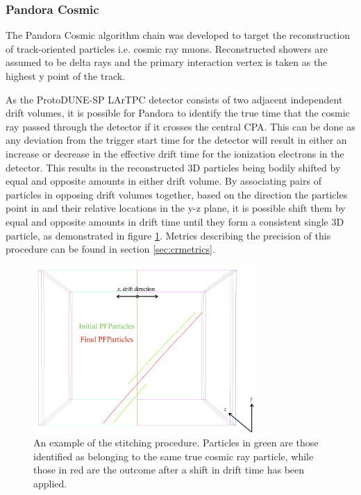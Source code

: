 
\subsubsection{Pandora Cosmic}

The Pandora Cosmic algorithm chain \cite{pandorauboone} was developed to target the reconstruction of track-oriented particles i.e. cosmic ray muons.  Reconstructed showers are assumed to be delta rays and the primary interaction vertex is taken as the highest y point of the track.

As the ProtoDUNE-SP LArTPC detector consists of two adjacent independent drift volumes, it is possible for Pandora to identify the true time that the cosmic ray passed through the detector if it crosses the central CPA.  This can be done as any deviation from the trigger start time for the detector will result in either an increase or decrease in the effective drift time for the ionization electrons in the detector.  This results in the reconstructed 3D particles being bodily shifted by equal and opposite amounts in either drift volume.  By associating pairs of particles in opposing drift volumes together, based on the direction the particles point in and their relative locations in the y-z plane, it is possible shift them by equal and opposite amounts in drift time until they form a consistent single 3D particle, as demonstrated in figure \ref{fig:stitching}.  Metrics describing the precision of this procedure can be found in section \ref{sec:crmetrics}.

\begin{figure}
\centering
\includegraphics[width=0.75\textwidth]{Figures/EventDisplays/Stitching/StitchingExample.pdf}
\caption{An example of the stitching procedure.  Particles in green are those identified as belonging to the same true cosmic ray particle, while those in red are the outcome after a shift in drift time has been applied.}
\label{fig:stitching}
\end{figure}

